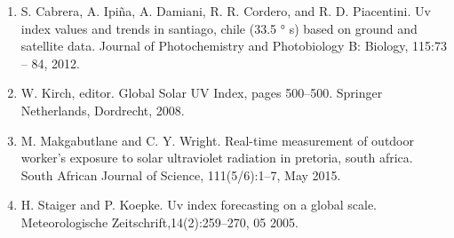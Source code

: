 \documentclass{article}
\begin{document}
\begin{multicols}{2}
\begin{center}
\begin{enumerate}
\item  S. Cabrera, A. Ipiña, A. Damiani, R. R. Cordero, and R. D. Piacentini. Uv index values and trends
in santiago, chile (33.5 ° s) based on ground and satellite data. Journal of Photochemistry and
Photobiology B: Biology, 115:73 – 84, 2012.
\item  W. Kirch, editor. Global Solar UV Index, pages 500–500. Springer Netherlands, Dordrecht, 2008.
\item M. Makgabutlane and C. Y. Wright. Real-time measurement of outdoor worker’s exposure to solar
ultraviolet radiation in pretoria, south africa. South African Journal of Science, 111(5/6):1–7, May
2015.
\item H. Staiger and P. Koepke. Uv index forecasting on a global scale. Meteorologische Zeitschrift,14(2):259–270, 05 2005.
\end{enumerate}
\end{center}
\end{multicols}
\end{document}
